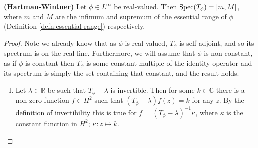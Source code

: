 \documentclass[../main.tex]{subfiles}
\begin{document}
\begin{theorem}{\textbf{(Hartman-Wintner)}}\label{thm:hartman-wintner}
Let $\phi \in L^\infty$ be real-valued. Then $\mathrm{Spec}(T_\phi) = [m, M]$, where $m$ and $M$ are the infimum and supremum of the essential range of $\phi$ (Definition \ref{defn:essential-range}) respectively.
\end{theorem}
\begin{proof}
Note we already know that as $\phi$ is real-valued, $T_\phi$ is self-adjoint, and so its spectrum is on the real line. %
Furthermore, we will assume that $\phi$ is non-constant, as if $\phi$ is constant then $T_\phi$ is some constant multiple of the identity operator
and its spectrum is simply the set containing that constant, and the result holds.
\begin{enumerate}[I.]
\item Let $\lambda \in \mathbb{R}$ be such that $T_\phi - \lambda$ is invertible. Then for some $k \in \mathbb{C}$ there is a non-zero function $f \in H^2$ such that $(T_\phi - \lambda)f(z) = k$ for any $z$. By the definition of invertibility this is true for $f$ = $(T_\phi - \lambda)^{-1}\kappa$, where
$\kappa$ is the constant function in $H^2$; $\kappa : z \mapsto k$.


\end{enumerate}
\end{proof}
\end{document}

